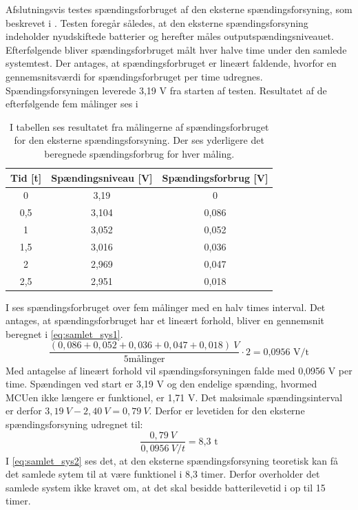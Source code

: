 Afslutningsvis testes spændingsforbruget af den eksterne spændingsforsyning, som beskrevet i . Testen foregår således, at den eksterne spændingsforsyning indeholder nyudskiftede batterier og herefter måles outputspændingsniveauet. Efterfølgende bliver spændingsforbruget målt hver halve time under den samlede systemtest. Der antages, at spændingsforbruget er lineært faldende, hvorfor en gennemsnitsværdi for spændingsforbruget per time udregnes. \\
Spændingsforsyningen leverede 3,19 V fra starten af testen. Resultatet af de efterfølgende fem målinger ses i 
\begin{table}[H]
	\centering
	\begin{tabular}{ccc}
		\hline
		\cellcolor[HTML]{C0C0C0}Tid {[}t{]} & \cellcolor[HTML]{C0C0C0} Spændingsniveau {[}V{]} & \cellcolor[HTML]{C0C0C0}Spændingsforbrug {[}V{]} \\ \hline
		0 & 3,19 & 0 \\ \hline	
		0,5 & 3,104 & 0,086 \\ \hline	
		1 & 3,052 & 0,052 \\ \hline
		1,5 & 3,016 & 0,036 \\ \hline
		2 & 2,969 & 0,047 \\ \hline
		2,5 & 2,951 & 0,018 \\ \hline
	\end{tabular}
	\caption{I tabellen ses resultatet fra målingerne af spændingsforbruget for den eksterne spændingsforsyning. Der ses yderligere det beregnede spændingsforbrug for hver måling.}
	\label{tab:samlet_sys_batteri}
\end{table}\vspace{-.25cm}
I  ses spændingsforbruget over fem målinger med en halv times interval. Det antages, at spændingsforbruget har et lineært forhold, bliver en gennemsnit beregnet i \eqref{eq:samlet_sys1}.
\begin{equation}
\frac{(0,086 + 0,052 + 0,036 + 0,047 + 0,018)~V}{5 \text{målinger}} \cdot 2 = \text{0,0956~V/t}
\label{eq:samlet_sys1}
\end{equation}
Med antagelse af lineært forhold vil spændingsforsyningen falde med 0,0956 V per time. Spændingen ved start er 3,19 V og den endelige spænding, hvormed MCUen ikke længere er funktionel, er 1,71 V. Det maksimale spændingsinterval er derfor $3,19~V - 2,40~V = 0,79~V$. Derfor er levetiden for den eksterne spændingsforsyning udregnet til:
\begin{equation}
\frac{0,79~V}{0,0956~V/t} = \text{8,3~t}
\label{eq:samlet_sys2}
\end{equation}
I \eqref{eq:samlet_sys2} ses det, at den eksterne spændingsforsyning teoretisk kan få det samlede sytem til at være funktionel i 8,3 timer. Derfor overholder det samlede system ikke kravet om, at det skal besidde batterilevetid i op til 15 timer. 